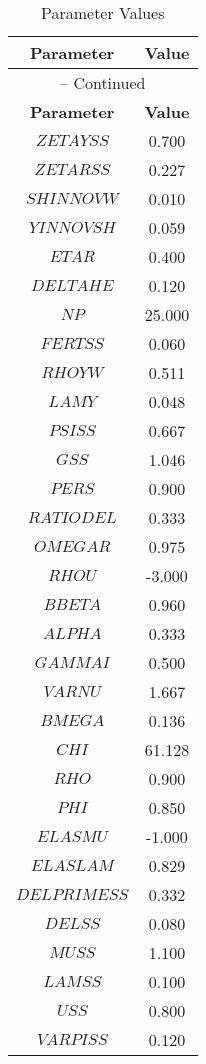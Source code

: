 \begin{center}
\begin{longtable}{cc}
\caption{Parameter Values}\\%
\toprule%
\multicolumn{1}{c}{\textbf{Parameter}} &
\multicolumn{1}{c}{\textbf{Value}}  \\%
\midrule%
\endfirsthead
\multicolumn{2}{c}{{\tablename} \thetable{} -- Continued}\\%
\midrule%
\multicolumn{1}{c}{\textbf{Parameter}} &
\multicolumn{1}{c}{\textbf{Value}} \\%
\midrule%
\endhead
$ZETAYSS$ 	 & 	 0.700 \\
$ZETARSS$ 	 & 	 0.227 \\
$SHINNOVW$ 	 & 	 0.010 \\
$YINNOVSH$ 	 & 	 0.059 \\
$ETAR$ 	 & 	 0.400 \\
$DELTAHE$ 	 & 	 0.120 \\
$NP$ 	 & 	 25.000 \\
$FERTSS$ 	 & 	 0.060 \\
$RHOYW$ 	 & 	 0.511 \\
$LAMY$ 	 & 	 0.048 \\
$PSISS$ 	 & 	 0.667 \\
$GSS$ 	 & 	 1.046 \\
$PERS$ 	 & 	 0.900 \\
$RATIODEL$ 	 & 	 0.333 \\
$OMEGAR$ 	 & 	 0.975 \\
$RHOU$ 	 & 	 -3.000 \\
$BBETA$ 	 & 	 0.960 \\
$ALPHA$ 	 & 	 0.333 \\
$GAMMAI$ 	 & 	 0.500 \\
$VARNU$ 	 & 	 1.667 \\
$BMEGA$ 	 & 	 0.136 \\
$CHI$ 	 & 	 61.128 \\
$RHO$ 	 & 	 0.900 \\
$PHI$ 	 & 	 0.850 \\
$ELASMU$ 	 & 	 -1.000 \\
$ELASLAM$ 	 & 	 0.829 \\
$DELPRIMESS$ 	 & 	 0.332 \\
$DELSS$ 	 & 	 0.080 \\
$MUSS$ 	 & 	 1.100 \\
$LAMSS$ 	 & 	 0.100 \\
$USS$ 	 & 	 0.800 \\
$VARPISS$ 	 & 	 0.120 \\

\end{longtable}
\end{center}
